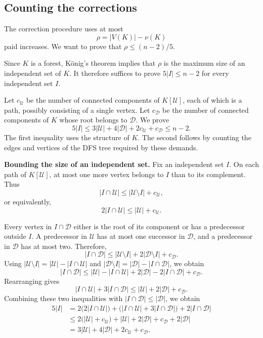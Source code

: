 \documentclass[11pt]{amsart}
\newcommand{\1}{\mathbbm{1}}
\begin{document}
\subsection{Counting the corrections}

The correction procedure uses at most
\[
 \rho=|V(K)|-\nu(K)
\]
paid increases. We want to prove that $\rho\le(n-2)/5$.

Since $K$ is a forest, K\"onig's theorem implies that $\rho$
is the maximum size of an independent set of $K$.
It therefore suffices to prove $5|I|\le n-2$ for every
independent set $I$.

Let $c_{\mathcal U}$ be the number of connected components
of $K[\mathcal U]$, each of which is a path, possibly
consisting of a single vertex.
Let $c_{\mathcal D}$ be the number of connected components
of $K$ whose root belongs to $\mathcal D$.
We prove
\[
 5|I|
 \le 3|\mathcal U|+4|\mathcal D|
       +2c_{\mathcal U}+c_{\mathcal D}
 \le n-2.
\]
The first inequality uses the structure of $K$.
The second follows by counting the edges and vertices
of the DFS tree required by these demands.

\smallskip\noindent
\textbf{Bounding the size of an independent set.}
Fix an independent set $I$.
On each path of $K[\mathcal U]$, at most one more vertex
belongs to $I$ than to its complement. Thus
\[
 |I\cap\mathcal U|
 \le|\mathcal U\setminus I|+c_{\mathcal U},
\]
or equivalently,
\[
 2|I\cap\mathcal U|\le|\mathcal U|+c_{\mathcal U}.
\]

Every vertex in $I\cap\mathcal D$ either is the root of
its component or has a predecessor outside $I$.
A predecessor in $\mathcal U$ has at most one successor
in $\mathcal D$, and a predecessor in $\mathcal D$
has at most two. Therefore,
\[
 |I\cap\mathcal D|
 \le|\mathcal U\setminus I|
   +2|\mathcal D\setminus I|+c_{\mathcal D}.
\]
Using $|\mathcal U\setminus I|=|\mathcal U|-|I\cap\mathcal U|$
and $|\mathcal D\setminus I|=|\mathcal D|-|I\cap\mathcal D|$,
we obtain
\[
 |I\cap\mathcal D|
 \le|\mathcal U|-|I\cap\mathcal U|
   +2|\mathcal D|-2|I\cap\mathcal D|+c_{\mathcal D}.
\]
Rearranging gives
\[
 |I\cap\mathcal U|+3|I\cap\mathcal D|
 \le|\mathcal U|+2|\mathcal D|+c_{\mathcal D}.
\]
Combining these two inequalities with
$|I\cap\mathcal D|\le|\mathcal D|$, we obtain
\[
 \begin{aligned}
 5|I|
 &=2\bigl(2|I\cap\mathcal U|\bigr)
   +\bigl(|I\cap\mathcal U|+3|I\cap\mathcal D|\bigr)
   +2|I\cap\mathcal D|\\
 &\le
 2\bigl(|\mathcal U|+c_{\mathcal U}\bigr)
 +|\mathcal U|+2|\mathcal D|+c_{\mathcal D}
 +2|\mathcal D|\\
 &=3|\mathcal U|+4|\mathcal D|
   +2c_{\mathcal U}+c_{\mathcal D}.
 \end{aligned}
\]
\end{document}
